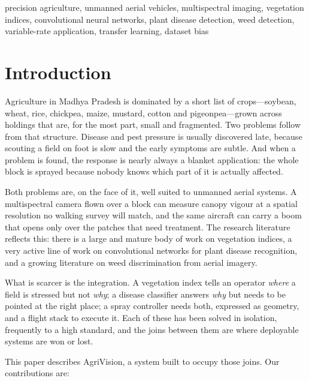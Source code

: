 \documentclass[conference]{IEEEtran}
\begin{document}
\begin{IEEEkeywords}
precision agriculture, unmanned aerial vehicles, multispectral imaging,
vegetation indices, convolutional neural networks, plant disease detection,
weed detection, variable-rate application, transfer learning, dataset bias
\end{IEEEkeywords}

\section{Introduction}

Agriculture in Madhya Pradesh is dominated by a short list of crops---soybean,
wheat, rice, chickpea, maize, mustard, cotton and pigeonpea---grown across
holdings that are, for the most part, small and fragmented. Two problems follow
from that structure. Disease and pest pressure is usually discovered late,
because scouting a field on foot is slow and the early symptoms are subtle.
And when a problem is found, the response is nearly always a blanket
application: the whole block is sprayed because nobody knows which part of it
is actually affected.

Both problems are, on the face of it, well suited to unmanned aerial systems. A
multispectral camera flown over a block can measure canopy vigour at a spatial
resolution no walking survey will match, and the same aircraft can carry a
boom that opens only over the patches that need treatment. The research
literature reflects this: there is a large and mature body of work on
vegetation indices, a very active line of work on convolutional networks for
plant disease recognition, and a growing literature on weed discrimination
from aerial imagery.

What is scarcer is the integration. A vegetation index tells an operator
\emph{where} a field is stressed but not \emph{why}; a disease classifier
answers \emph{why} but needs to be pointed at the right place; a spray
controller needs both, expressed as geometry, and a flight stack to execute it.
Each of these has been solved in isolation, frequently to a high standard, and
the joins between them are where deployable systems are won or lost.

This paper describes AgriVision, a system built to occupy those joins. Our
contributions are:
\end{document}
